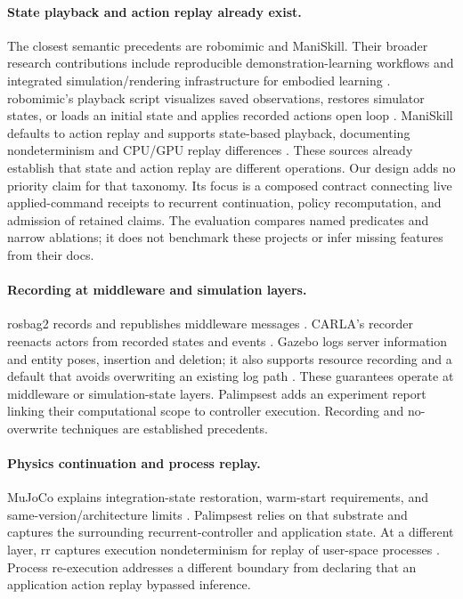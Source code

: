 \documentclass[10pt]{article}
\begin{document}
\paragraph{State playback and action replay already exist.}
The closest semantic precedents are robomimic and ManiSkill. Their broader
research contributions include reproducible demonstration-learning workflows
\citep{mandlekar2022robomimic} and integrated simulation/rendering infrastructure
for embodied learning \citep{tao2025maniskill3}.
robomimic's playback script visualizes saved observations, restores simulator
states, or loads an initial state and applies recorded actions open loop
\citep{robomimicplayback}. ManiSkill defaults to action replay and supports
state-based playback, documenting nondeterminism and CPU/GPU replay differences
\citep{maniskillreplay}. These sources already establish that state and action
replay are different operations. Our design adds no priority claim for that
taxonomy. Its focus is a composed contract connecting live applied-command
receipts to recurrent continuation, policy recomputation, and admission of
retained claims. The evaluation compares named predicates and narrow ablations;
it does not benchmark these projects or infer missing features from their docs.

\paragraph{Recording at middleware and simulation layers.}
rosbag2 records and republishes middleware messages \citep{rosbag2}.
CARLA's recorder reenacts actors from recorded states and events
\citep{carlarecorder}. Gazebo logs server information and entity poses,
insertion and deletion; it also supports resource recording and a default that
avoids overwriting an existing log path \citep{gazebologging}.
These guarantees operate at middleware or simulation-state layers. Palimpsest
adds an experiment report linking their computational scope to controller
execution. Recording and no-overwrite techniques are established precedents.

\paragraph{Physics continuation and process replay.}
MuJoCo explains integration-state restoration, warm-start requirements, and
same-version/architecture limits \citep{mujococomputation}. Palimpsest relies on
that substrate and captures the surrounding recurrent-controller and application
state. At a different layer, rr captures execution nondeterminism for replay of
user-space processes \citep{ocallahan2017rr}. Process re-execution addresses a different boundary from declaring that an
application action replay bypassed inference.
\end{document}
